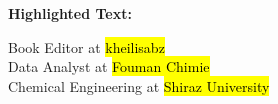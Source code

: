 \documentclass[12pt]{article}
\begin{document}
  
                    \begin{center}  
                           \textbf{Highlighted Text:}  
                    \end{center}  
                                   Book Editor at \hl{kheilisabz} \\
                                    Data Analyst at  \hl{Fouman Chimie}\\  
                                    Chemical Engineering at  \hl{Shiraz University}  
                
\end{document}
